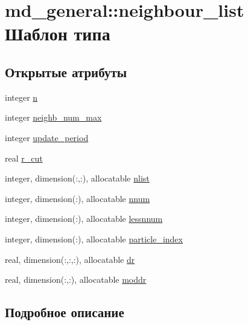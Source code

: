 \hypertarget{structmd__general_1_1neighbour__list}{}\section{md\+\_\+general\+:\+:neighbour\+\_\+list Шаблон типа}
\label{structmd__general_1_1neighbour__list}
\subsection*{Открытые атрибуты}
\begin{DoxyCompactItemize}
\item 
integer \mbox{\hyperlink{structmd__general_1_1neighbour__list_ac8835eba37a1d4a571c1797f2f000caa}{n}}
\item 
integer \mbox{\hyperlink{structmd__general_1_1neighbour__list_aef9929be6a189ba679c5382d515ff56a}{neighb\+\_\+num\+\_\+max}}
\item 
integer \mbox{\hyperlink{structmd__general_1_1neighbour__list_a5c1f0bad546bc4997cc802c0db9b163a}{update\+\_\+period}}
\item 
real \mbox{\hyperlink{structmd__general_1_1neighbour__list_a6ed9510d3ad2c58c70c4446a74dd5974}{r\+\_\+cut}}
\item 
integer, dimension(\+:,\+:), allocatable \mbox{\hyperlink{structmd__general_1_1neighbour__list_ae894f779377ac71e0c591272fae124c2}{nlist}}
\item 
integer, dimension(\+:), allocatable \mbox{\hyperlink{structmd__general_1_1neighbour__list_ae6525e2a9309928e7cdf74d4b5f23016}{nnum}}
\item 
integer, dimension(\+:), allocatable \mbox{\hyperlink{structmd__general_1_1neighbour__list_ac2663595371bcadef9021fde96eb9e71}{lessnnum}}
\item 
integer, dimension(\+:), allocatable \mbox{\hyperlink{structmd__general_1_1neighbour__list_ae009b5d034f5fc26f2f425b6968699e1}{particle\+\_\+index}}
\item 
real, dimension(\+:,\+:,\+:), allocatable \mbox{\hyperlink{structmd__general_1_1neighbour__list_ad04c0f4c8b02738add67dc7fefaaace0}{dr}}
\item 
real, dimension(\+:,\+:), allocatable \mbox{\hyperlink{structmd__general_1_1neighbour__list_a972b5bc1afb59e1eabc494df4375b4a2}{moddr}}
\end{DoxyCompactItemize}


\subsection{Подробное описание}


